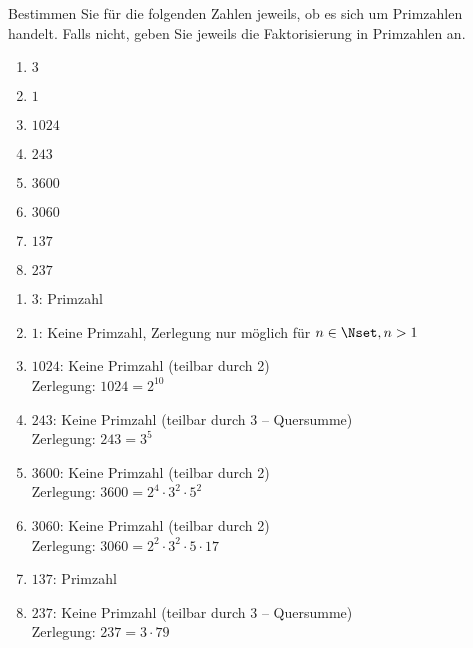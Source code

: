 \documentclass[12pt]{exam}
\begin{document}
\begin{questions}

Bestimmen Sie für die folgenden Zahlen jeweils, ob es sich um Primzahlen handelt. Falls nicht, geben Sie jeweils die Faktorisierung in Primzahlen an.\\
\parbox{0.5\textwidth}{\begin{enumerate}
		\item $3$    %
		\item $1$    %
		\item $1024$ %
		\item $243$  %
\end{enumerate}}\parbox{0.5\textwidth}{\begin{enumerate}\setcounter{enumi}{4}
		\item $3600$ %
		\item $3060$ %
		\item $137$  %
		\item $237$  %
\end{enumerate}}
\begin{solution}
\begin{enumerate}
	\item $3$:    Primzahl
	\item $1$:    Keine Primzahl, Zerlegung nur möglich für $n\in\Nset, n>1$
	\item $1024$: Keine Primzahl (teilbar durch 2)\\Zerlegung: $1024=2^{10}$
	\item $243$:  Keine Primzahl (teilbar durch 3 -- Quersumme)\\Zerlegung: $243=3^5$
	\item $3600$: Keine Primzahl (teilbar durch 2)\\Zerlegung: $3600=2^4\cdot3^2\cdot5^2$
	\item $3060$: Keine Primzahl (teilbar durch 2)\\Zerlegung: $3060=2^2\cdot3^2\cdot5\cdot17$
	\item $137$:  Primzahl
	\item $237$:  Keine Primzahl (teilbar durch 3 -- Quersumme)\\Zerlegung: $237=3\cdot79$
\end{enumerate}
\end{solution}


\pagebreak




\end{questions}
\end{document}
